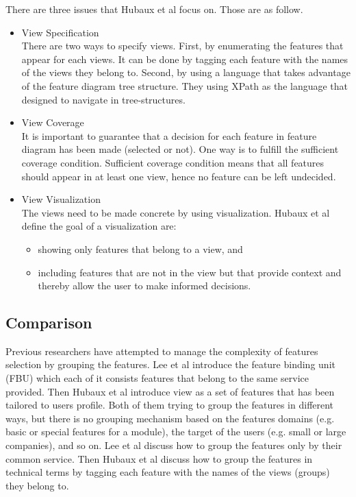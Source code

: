 There are three issues that Hubaux et al focus on. Those are as follow.
\begin{itemize}
	\item View Specification \\
	There are two ways to specify views. First, by enumerating the features that appear for each views. It can be done by tagging each feature with the names of the views they belong to. Second, by using a language that takes advantage of the feature diagram tree structure. They using XPath as the language that designed to navigate in tree-structures.
	
	\item View Coverage \\
	It is important to guarantee that a decision for each feature in feature diagram has been made (selected or not). One way is to fulfill the sufficient coverage condition. Sufficient coverage condition means that all features should appear in at least one view, hence no feature can be left undecided.
	
	\item View Visualization \\
	The views need to be made concrete by using visualization. Hubaux et al define the goal of a visualization are:
	\begin{itemize}
		\item showing only features that belong to a view, and 
		\item including features that are not in the view but that provide context and thereby allow the user to make informed decisions.
	\end{itemize}
\end{itemize}

\subsection{Comparison}
Previous researchers have attempted to manage the complexity of features selection by grouping the features. Lee et al introduce the feature binding unit (FBU) which each of it consists features that belong to the same service provided. Then Hubaux et al introduce view as a set of features that has been tailored to users profile. Both of them trying to group the features in different ways, but there is no grouping mechanism based on the features domains (e.g. basic or special features for a module), the target of the users (e.g. small or large companies), and so on. Lee et al discuss how to group the features only by their common service. Then Hubaux et al discuss how to group the features in technical terms by tagging each feature with the names of the views (groups) they belong to.


